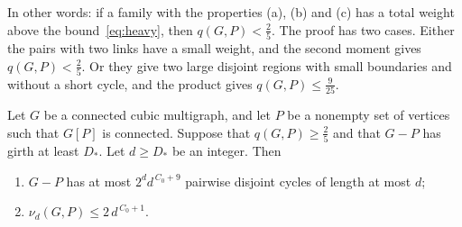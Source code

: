 \documentclass[11pt]{article}
\begin{document}
In other words: if a family with the properties (a), (b) and (c) has a total weight above the
bound~\eqref{eq:heavy}, then $q(G,P)<\frac25$. The proof has two cases. Either the pairs with two
links have a small weight, and the second moment gives $q(G,P)<\frac25$. Or they give two large
disjoint regions with small boundaries and without a short cycle, and the product gives
$q(G,P)\le\frac9{25}$.

\begin{proposition}[Packing]\label{prop:packing}
Let $G$ be a connected cubic multigraph, and let $P$ be a nonempty set of vertices such that
$G[P]$ is connected. Suppose that $q(G,P)\ge\frac25$ and that $G-P$ has girth at least $D_*$. Let
$d\ge D_*$ be an integer. Then
\begin{enumerate}
\item[\textup{(i)}] $G-P$ has at most $2^{d}d^{\,C_0+9}$ pairwise disjoint cycles of length at
most $d$;
\item[\textup{(ii)}] $\nu_d(G,P)\le2\,d^{\,C_0+1}$.
\end{enumerate}
\end{proposition}
\end{document}
